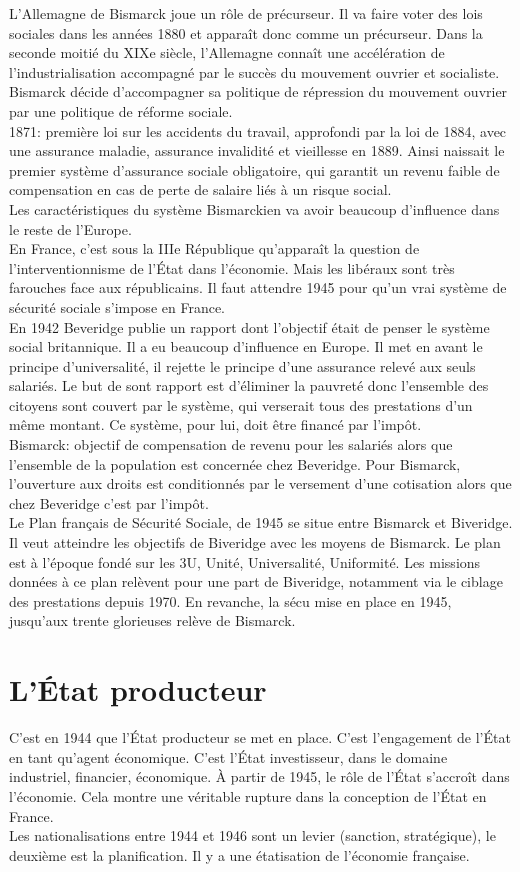 \documentclass[10pt, a4paper, openany]{book}
\begin{document}
L'Allemagne de Bismarck joue un rôle de précurseur. Il va faire voter des lois sociales dans les années 1880 et apparaît donc comme un précurseur. Dans la seconde moitié du XIXe siècle, l'Allemagne connaît une accélération de l'industrialisation accompagné par le succès du mouvement ouvrier et socialiste. Bismarck décide d'accompagner sa politique de répression du mouvement ouvrier par une politique de réforme sociale. \\
1871: première loi sur les accidents du travail, approfondi par la loi de 1884, avec une assurance maladie, assurance invalidité et vieillesse en 1889. Ainsi naissait le premier système d'assurance sociale obligatoire, qui garantit un revenu faible de compensation en cas de perte de salaire liés à un risque social. \\
Les caractéristiques du système Bismarckien va avoir beaucoup d'influence dans le reste de l'Europe. \\
En France, c'est sous la IIIe République qu'apparaît la question de l'interventionnisme de l'État dans l'économie. Mais les libéraux sont très farouches face aux républicains. Il faut attendre 1945 pour qu'un vrai système de sécurité sociale s'impose en France. \\
En 1942 Beveridge publie un rapport dont l'objectif était de penser le système social britannique. Il a eu beaucoup d'influence en Europe. Il met en avant le principe d'universalité, il rejette le principe d'une assurance relevé aux seuls salariés. Le but de sont rapport est d'éliminer la pauvreté donc l'ensemble des citoyens sont couvert par le système, qui verserait tous des prestations d'un même montant. Ce système, pour lui, doit être financé par l'impôt. \\
Bismarck: objectif de compensation de revenu pour les salariés alors que l'ensemble de la population est concernée chez Beveridge. Pour Bismarck, l'ouverture aux droits est conditionnés par le versement d'une cotisation alors que chez Beveridge c'est par l'impôt. \\
Le Plan français de Sécurité Sociale, de 1945 se situe entre Bismarck et Biveridge. Il veut atteindre les objectifs de Biveridge avec les moyens de Bismarck. Le plan est à l'époque fondé sur les 3U, Unité, Universalité, Uniformité. Les missions données à ce plan relèvent pour une part de Biveridge, notamment via le ciblage des prestations depuis 1970. En revanche, la sécu mise en place en 1945, jusqu'aux trente glorieuses relève de Bismarck. 

\section{L'État producteur}

C'est en 1944 que l'État producteur se met en place. C'est l'engagement de l'État en tant qu'agent économique. C'est l'État investisseur, dans le domaine industriel, financier, économique. À partir de 1945, le rôle de l'État s'accroît dans l'économie. Cela montre une véritable rupture dans la conception de l'État en France. \\
Les nationalisations entre 1944 et 1946 sont un levier (sanction, stratégique), le deuxième est la planification. Il y a une étatisation de l'économie française. 
\end{document}
